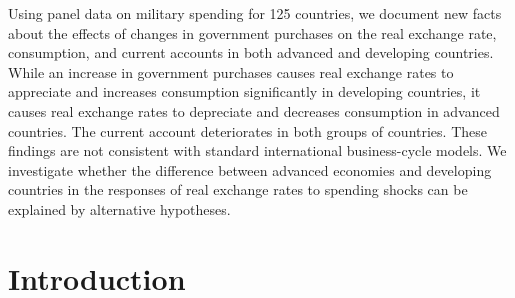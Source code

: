 \documentclass{ZJSUthesis}
\begin{document}
Using panel data on military spending for 125 countries, we document new facts about the
effects of changes in government purchases on the real exchange rate, consumption, and current
accounts in both advanced and developing countries. While an increase in government
purchases causes real exchange rates to appreciate and increases consumption significantly in
developing countries, it causes real exchange rates to depreciate and decreases consumption in
advanced countries. The current account deteriorates in both groups of countries. These findings
are not consistent with standard international business-cycle models. We investigate whether the
difference between advanced economies and developing countries in the responses of real
exchange rates to spending shocks can be explained by alternative hypotheses.


\xiaosihao

\newpage
{}
\setcounter{page}{1}
\renewcommand\contentsname{Table of Contents}

\tableofcontents
\renewcommand\tablename{Table}
\renewcommand\figurename{Figure}
\newpage
{}
\setcounter{page}{1}




\section{Introduction}
\end{document}
